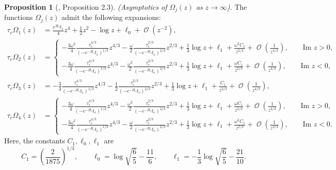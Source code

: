 \documentclass[usenames,dvipsnames]{article}
\theoremstyle{definition}
\newtheorem{prop}{Proposition}[section]
\DeclareMathOperator{\OO}{\mathcal{O}}
\numberwithin{equation}{section}
\numberwithin{figure}{section}
\begin{document}
    \begin{prop}[\cite{DHL1}, Proposition 2.3]
        \textit{(Asymptotics of $\Omega_j(z)$ as $z\to\infty$).} The functions $\Omega_j(z)$ admit the following expansions:
            \begin{align}
                    \tau_c \Omega_1(z) &= \frac{e^{H_c}t_c}{4}z^4 + \frac{1}{2}z^2 - \log z + \ell_0 + \OO(z^{-2}), \label{Omega-Sheet-1-infty}\\
                    \tau_c \Omega_{2}(z) &= \begin{cases}
                       -\frac{3\omega^2}{4}\frac{\tau_c^{4/3}}{(-e^{-H_c}t_c)^{1/3}}z^{4/3} - \frac{\omega}{2} \frac{\tau_c^{2/3}}{(-e^{-H_c}t_c)^{2/3}} z^{2/3} + \frac{1}{3}\log z + \ell_1 + \frac{\omega^2 C_1}{z^{2/3}} +  \OO\left(\frac{1}{z^{4/3}}\right), \qquad \text{Im } z > 0, \\
                        -\frac{3\omega}{4}\frac{\tau_c^{4/3}}{(-e^{-H_c}t_c)^{1/3}}z^{4/3} - \frac{\omega^2}{2} \frac{\tau_c^{2/3}}{(-e^{-H_c}t_c)^{2/3}} z^{2/3} + \frac{1}{3}\log z + \ell_1 + \frac{\omega C_1}{z^{2/3}} +  \OO\left(\frac{1}{z^{4/3}}\right), \qquad \text{Im } z < 0,
                        \end{cases} \label{Omega-Sheet-2-infty}\\
                        \tau_c \Omega_{3}(z) &= -\frac{3}{4}\frac{\tau_c^{4/3}}{(-e^{-H_c}t_c)^{1/3}}z^{4/3} - \frac{1}{2} \frac{\tau_c^{2/3}}{(-e^{-H_c}t_c)^{2/3}} z^{2/3} + \frac{1}{3}\log z + \ell_1 + \frac{C_1}{z^{2/3}} +  \OO\left(\frac{1}{z^{4/3}}\right),\label{Omega-Sheet-3-infty}\\
                        \tau_c \Omega_{4}(z) &= \begin{cases}
                        -\frac{3\omega}{4}\frac{\tau_c^{4/3}}{(-e^{-H_c}t_c)^{1/3}}z^{4/3} - \frac{\omega^2}{2} \frac{\tau_c^{2/3}}{(-e^{-H_c}t_c)^{2/3}} z^{2/3} + \frac{1}{3}\log z + \ell_1 + \frac{\omega C_1}{z^{2/3}} +  \OO\left(\frac{1}{z^{4/3}}\right), \qquad \text{Im } z > 0, \\
                        -\frac{3\omega^2}{4}\frac{\tau_c^{4/3}}{(-e^{-H_c}t_c)^{1/3}}z^{4/3} - \frac{\omega}{2} \frac{\tau_c^{2/3}}{(-e^{-H_c}t_c)^{2/3}} z^{2/3} + \frac{1}{3}\log z + \ell_1 + \frac{\omega^2 C_1}{z^{2/3}} +  \OO\left(\frac{1}{z^{4/3}}\right),\qquad \text{Im } z < 0.
                        \end{cases}\label{Omega-Sheet-4-infty}
                \end{align}
            Here, the constants $C_1,\ell_0,\ell_1$ are
                \begin{equation}\label{critical-C-L}
                    C_1 =\left(\frac{2}{1875}\right)^{1/3}, \qquad 
                    \ell_0 = \log\sqrt{\frac{6}{5}} -\frac{11}{6},\qquad
                    \ell_1 = -\frac{1}{3}\log\sqrt{\frac{6}{5}}-\frac{21}{10}.
                \end{equation}
    \end{prop}
\end{document}
